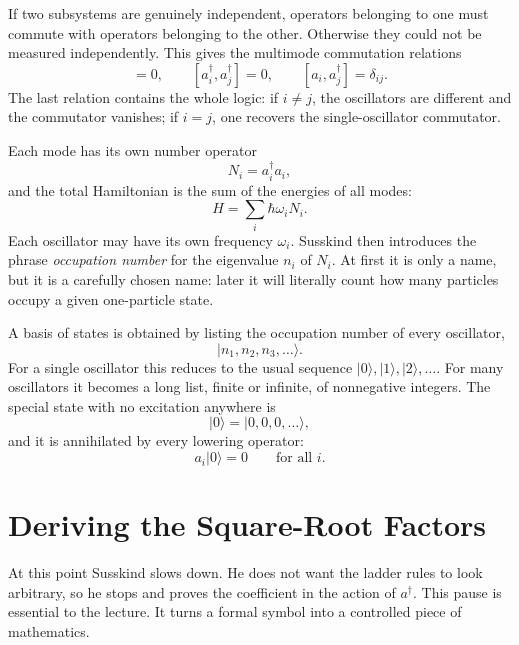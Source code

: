 If two subsystems are genuinely independent, operators belonging to one must commute with operators belonging to the other. Otherwise they could not be measured independently. This gives the multimode commutation relations
\begin{equation}
[a_i,a_j]=0,
\qquad
[a_i^\dagger,a_j^\dagger]=0,
\qquad
[a_i,a_j^\dagger]=\delta_{ij}.
\end{equation}
The last relation contains the whole logic: if \(i\neq j\), the oscillators are different and the commutator vanishes; if \(i=j\), one recovers the single-oscillator commutator.

Each mode has its own number operator
\begin{equation}
N_i=a_i^\dagger a_i,
\end{equation}
and the total Hamiltonian is the sum of the energies of all modes:
\begin{equation}
H=\sum_i \hbar\omega_i N_i.
\end{equation}
Each oscillator may have its own frequency \(\omega_i\). Susskind then introduces the phrase \emph{occupation number} for the eigenvalue \(n_i\) of \(N_i\). At first it is only a name, but it is a carefully chosen name: later it will literally count how many particles occupy a given one-particle state.

A basis of states is obtained by listing the occupation number of every oscillator,
\begin{equation}
|n_1,n_2,n_3,\ldots\rangle.
\end{equation}
For a single oscillator this reduces to the usual sequence \(|0\rangle,|1\rangle,|2\rangle,\ldots\). For many oscillators it becomes a long list, finite or infinite, of nonnegative integers. The special state with no excitation anywhere is
\begin{equation}
|0\rangle = |0,0,0,\ldots\rangle,
\end{equation}
and it is annihilated by every lowering operator:
\begin{equation}
a_i|0\rangle=0
\qquad
\text{for all } i.
\end{equation}

\section{Deriving the Square-Root Factors}

At this point Susskind slows down. He does not want the ladder rules to look arbitrary, so he stops and proves the coefficient in the action of \(a^\dagger\). This pause is essential to the lecture. It turns a formal symbol into a controlled piece of mathematics.

